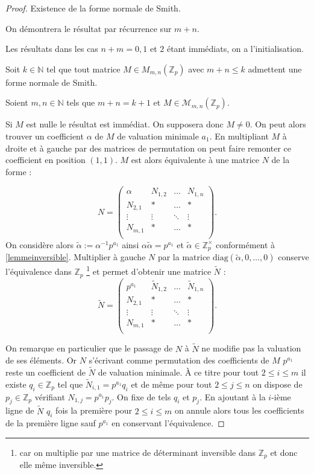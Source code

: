 \begin{proof} Existence de la forme normale de Smith.

On démontrera le résultat par récurrence sur $m+n$. 

Les résultats dans les cas $n+m= 0,1$ et $2$ étant immédiats, on a l'initialisation.

Soit $k \in \mathbb{N}$ tel que tout matrice $M \in M_{m,n}\left( \mathbb{Z}_{p}  \right) $ avec $m+n \le  k$ admettent une forme normale de Smith.

	Soient $m,n \in \mathbb{N}$ tels que $m+n = k+1$ et $M \in \mathcal{M}_{m,n}\left(\mathbb{Z}_p\right) $.

	Si $M$ est nulle le résultat est immédiat. On supposera donc $M \neq 0$. 
	On peut alors trouver un coefficient $\alpha$ de $M$ de valuation minimale $a_1$. En multipliant $M$ à droite et à gauche par des matrices de permutation on peut faire remonter ce coefficient en position $(1,1)$. $M$ est alors équivalente à une matrice $N$ de la forme :

	\[
N = 		\begin{pmatrix} \alpha & N_{1,2} & \ldots & N_{1,n} \\
			N_{2,1} & * & \ldots & *\\
			\vdots & \vdots & \ddots & \vdots \\
			N_{m,1} &* & \ldots & *\\
		\end{pmatrix} 
	.\] 
	On considère alors $\tilde{\alpha} := \alpha^{-1} p^{a_1}$ ainsi $\alpha\tilde{\alpha} = p^{a_1} $ et $\tilde{\alpha} \in \mathbb{Z}_p^\times $ conformément à \ref{lemmeinversible}.
Multiplier à gauche $N$ par la matrice $\text{diag}( \tilde{\alpha}, 0, \ldots,0)$ conserve l'équivalence dans $\mathbb{Z}_p$ \footnote{car on multiplie par une matrice de déterminant inversible dans $\mathbb{Z}_p$ et donc elle même inversible.} et permet d'obtenir une matrice $\tilde{N}$ :
	\[
\tilde{N} = 		\begin{pmatrix} p^{a_1} & \tilde{N}_{1,2} & \ldots & \tilde{N}_{1,n} \\
			N_{2,1} & * & \ldots & *\\
			\vdots & \vdots & \ddots & \vdots \\
			N_{m,1} &* & \ldots & *\\
		\end{pmatrix} 
	.\] 
	

On remarque en particulier que le passage de $N$ à $\tilde{N}$ ne modifie pas la valuation de ses éléments. Or $N$ s'écrivant comme permutation des coefficients de $M$ $p^{a_1} $ reste un coefficient de $\tilde{N}$ de valuation minimale. À ce titre pour tout $2\le i\le m$ il existe $q_{i} \in \mathbb{Z}_p$ tel que $\tilde{N}_{i,1} = p^{a_1}q_{i}$ et de même pour tout $2\le j\le n$ on dispose de $p_{j} \in \mathbb{Z}_p$ vérifiant $N_{1,j} = p^{a_1} p_{j}$. On fixe de tels $q_{i}$ et $p_{j}$. En ajoutant à la $i$-ième ligne de $\tilde{N}$ $q_{i}$ fois la première pour $2\le i\le m$ on annule alors tous les coefficients de la première ligne sauf $p^{a_1}$ en conservant l'équivalence.


\end{proof}
